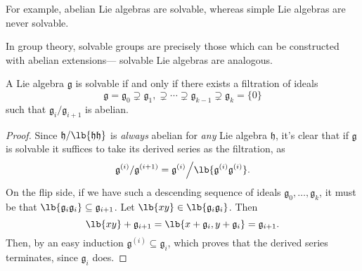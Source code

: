 \documentclass{article}
\DeclarePairedDelimiter\lb\lbrack\rbrack
\newcommand*\frkg{{\ensuremath{\mathfrak{g}}}}
\newcommand*\frkh{{\ensuremath{\mathfrak{h}}}}
\begin{document}
For example, abelian Lie algebras are solvable, whereas simple Lie algebras are never solvable.

In group theory, solvable groups are precisely those which can be constructed with abelian extensions--- solvable Lie algebras are analogous.

\begin{proposition}
    A Lie algebra $\frkg$ is solvable if and only if there exists a filtration of ideals
    \[
        \frkg = \frkg_0 \supsetneq \frkg_1, \supsetneq \cdots \supsetneq \frkg_{k-1} \supsetneq \frkg_k = \{0\}
    \]
    such that $\frkg_i / \frkg_{i+1}$ is abelian.
\end{proposition}

\begin{proof}
    Since $\frkh/\lb{\frkh\frkh}$ is \textit{always} abelian for \textit{any} Lie algebra $\frkh$, it's clear that if $\frkg$ is solvable it suffices to take its derived series as the filtration, as
    \[
        \frkg^{(i)}/\frkg^{(i+1)}
        =
        \frkg^{(i)}\Big/\lb{\frkg^{(i)}\frkg^{(i)}}.
    \]
    On the flip side, if we have such a descending sequence of ideals $\frkg_0, \ldots, \frkg_k$, it must be that $\lb{\frkg_i\frkg_i} \subseteq \frkg_{i+1}$. 
    Let $\lb{xy} \in \lb{\frkg_i\frkg_i}$.
    Then
    \[
        \lb{xy} + \frkg_{i+1}
        =
        \lb{x + \frkg_i, y + \frkg_i}
        =
        \frkg_{i+1}.
    \]
    Then, by an easy induction $\frkg^{(i)} \subseteq \frkg_i$, which proves that the derived series terminates, since $\frkg_i$ does.
\end{proof}
\end{document}
